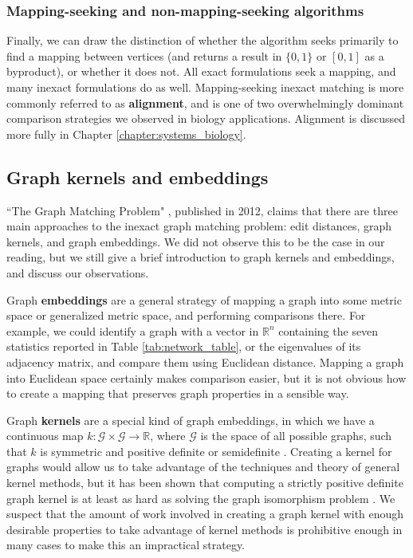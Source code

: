 \documentclass[12pt]{thesis}
\theoremstyle{plain}
\theoremstyle{definition}
\theoremstyle{remark}
\newcommand{\R}{\mathbb{R}}
\begin{document}
\subsubsection{Mapping-seeking and non-mapping-seeking algorithms} 

Finally, we can draw the distinction of whether the algorithm seeks primarily to find a mapping between vertices (and returns a result in $\{0,1\}$ or $[0,1]$ as a byproduct), or whether it does not. All exact formulations seek a mapping, and many inexact formulations do as well. Mapping-seeking inexact matching is more commonly referred to as \textbf{alignment}, and is one of two overwhelmingly dominant comparison strategies we observed in biology applications. Alignment is discussed more fully in Chapter \ref{chapter:systems_biology}.

\subsection{Graph kernels and embeddings}

``The Graph Matching Problem" \cite{Livi_2012}, published in 2012, claims that there are three main approaches to the inexact graph matching problem: edit distances, graph kernels, and graph embeddings. We did not observe this to be the case in our reading, but we still give a brief introduction to graph kernels and embeddings, and discuss our observations.

Graph \textbf{embeddings} are a general strategy of mapping a graph into some metric space or generalized metric space, and performing comparisons there. For example, we could identify a graph with a vector in $\R^n$ containing the seven statistics reported in Table \ref{tab:network_table}, or the eigenvalues of its adjacency matrix, and compare them using Euclidean distance. Mapping a graph into Euclidean space certainly makes comparison easier, but it is not obvious how to create a mapping that preserves graph properties in a sensible way. 

Graph \textbf{kernels} are a special kind of graph embeddings, in which we have a continuous map $k:\mathcal{G}\times \mathcal{G}\rightarrow \R$, where $\mathcal{G}$ is the space of all possible graphs, such that $k$ is symmetric and positive definite or semidefinite \cite{Livi_2012}. Creating a kernel for graphs would allow us to take advantage of the techniques and theory of general kernel methods, but it has been shown that computing a strictly positive definite graph kernel is at least as hard as solving the graph isomorphism problem \cite{Gartner_2003}. We suspect that the amount of work involved in creating a graph kernel with enough desirable properties to take advantage of kernel methods is prohibitive enough in many cases to make this an impractical strategy.
\end{document}
